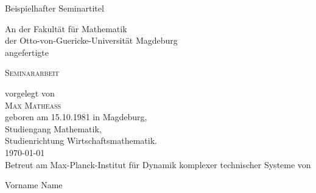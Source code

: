 %
%
%

\begin{titlepage}
  \begin{center}
    \vspace*{1,5cm}
    \begin{Large}
      \doublespacing
      \begin{scshape}
        Beispielhafter Seminartitel
      \end{scshape}
      \singlespacing
    \end{Large}
    \vspace{\fill}
    An der Fakultät für Mathematik\\
    der Otto-von-Guericke-Universität Magdeburg\\
    angefertigte\\
    \vspace{\fill}
    \begin{Large}
      \textsc{Seminararbeit}
      \\
    \end{Large}
    \vspace{\fill}

    vorgelegt von\\
    \textsc{Max Matheass}\\
    geboren am 15.10.1981 in Magdeburg,\\
    Studiengang Mathematik,\\
    Studienrichtung Wirtschaftsmathematik.\\[2ex]
    \today\\
    \vspace{\fill} Betreut am Max-Planck-Institut für Dynamik komplexer
    technischer Systeme
    von\\
    \begin{scshape}
      Vorname Name
    \end{scshape}
  \end{center}
\end{titlepage}


